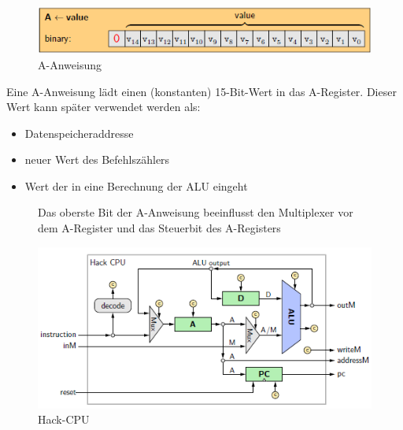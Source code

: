 \documentclass[12pt]{report}
\begin{document}
\begin{figure}[H]
  \caption{A-Anweisung}
  \label{fig:maschinensprache_a-anweisung}
  \centering
  \includegraphics{maschinensprache_a-anweisung}
\end{figure}

Eine A-Anweisung lädt einen (konstanten) 15-Bit-Wert in das A-Register.
Dieser Wert kann später verwendet werden als:
\begin{itemize}
  \item Datenspeicheraddresse
  \item neuer Wert des Befehlszählers
  \item Wert der in eine Berechnung der ALU eingeht
\end{itemize}


\begin{figure}[H]
  \begin{minipage}[t]{0.45\textwidth}
    Das oberste Bit der A-Anweisung beeinflusst den Multiplexer vor dem A-Register und das Steuerbit des A-Registers
  \end{minipage}
  \hfill
  \begin{minipage}[t]{0.45\textwidth}
    \caption{Hack-CPU}
    \label{fig:hack_cpu_leitungen1}
    \centering
    
    \includegraphics[width=\textwidth]{hack_cpu_leitungen}
  \end{minipage}
\end{figure}
\end{document}
